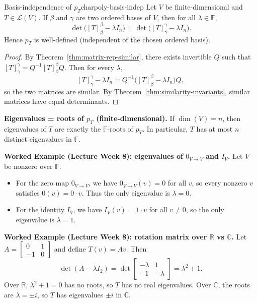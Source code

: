 \begin{theorem}{Basis-independence of $p_T$}{charpoly-basis-indep}
Let $V$ be finite-dimensional and $T\in\mathcal{L}(V)$.
If $\beta$ and $\gamma$ are two ordered bases of $V$, then for all $\lambda\in\mathbb{F}$,
\[
\det\bigl([T]^{\beta}_{\beta}-\lambda I_n\bigr)=\det\bigl([T]^{\gamma}_{\gamma}-\lambda I_n\bigr).
\]
Hence $p_T$ is well-defined (independent of the chosen ordered basis).
\end{theorem}

\begin{proof}
By Theorem~\ref{thm:matrix-rep-similar}, there exists invertible $Q$ such that
$[T]^{\gamma}_{\gamma}=Q^{-1}[T]^{\beta}_{\beta}Q$.
Then for every $\lambda$,
\[
[T]^{\gamma}_{\gamma}-\lambda I_n = Q^{-1}\bigl([T]^{\beta}_{\beta}-\lambda I_n\bigr)Q,
\]
so the two matrices are similar. By Theorem~\ref{thm:similarity-invariants}, similar matrices have equal determinants.
\end{proof}

\begin{keyformula}
\textbf{Eigenvalues = roots of $p_T$ (finite-dimensional).}
If $\dim(V)=n$, then eigenvalues of $T$ are exactly the $\mathbb{F}$-roots of $p_T$.
In particular, $T$ has at most $n$ distinct eigenvalues in $\mathbb{F}$.
\end{keyformula}

\begin{examplebox}
\textbf{Worked Example (Lecture Week 8): eigenvalues of $0_{V\to V}$ and $I_V$.}
Let $V$ be nonzero over $\mathbb{F}$.
\begin{itemize}
\item For the zero map $0_{V\to V}$, we have $0_{V\to V}(v)=0$ for all $v$, so every nonzero $v$ satisfies $0(v)=0\cdot v$.
Thus the only eigenvalue is $\lambda=0$.
\item For the identity $I_V$, we have $I_V(v)=1\cdot v$ for all $v\neq 0$, so the only eigenvalue is $\lambda=1$.
\end{itemize}
\end{examplebox}

\begin{examplebox}
\textbf{Worked Example (Lecture Week 8): rotation matrix over $\mathbb{R}$ vs $\mathbb{C}$.}
Let $A=\begin{bmatrix}0&1\\-1&0\end{bmatrix}$ and define $T(v)=Av$.
Then
\[
\det(A-\lambda I_2)=\det\begin{bmatrix}-\lambda&1\\-1&-\lambda\end{bmatrix}=\lambda^2+1.
\]
Over $\mathbb{R}$, $\lambda^2+1=0$ has no roots, so $T$ has no real eigenvalues.
Over $\mathbb{C}$, the roots are $\lambda=\pm i$, so $T$ has eigenvalues $\pm i$ in $\mathbb{C}$.
\end{examplebox}

